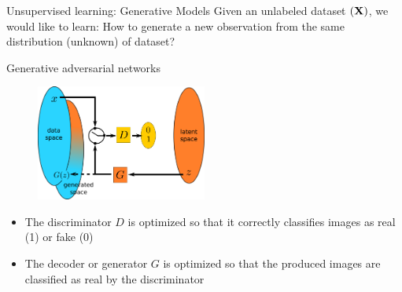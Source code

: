 \documentclass[xcolor=pdftex,dvipsnames,table,mathserif]{beamer}
\begin{document}
\begin{frame}{Unsupervised learning: Generative Models}
  Given an unlabeled dataset $(\mathbf{X})$, we would like to learn:
\alert{How to generate a new observation from the same distribution (unknown) of dataset?}
\begin{figure}
\centering
{}
\end{figure}
\end{frame}



\begin{frame}{Generative adversarial networks \cite{goodfellow_generative_2014}}

  \begin{figure}[ht]
    \centering
    \includegraphics[width=0.5\textwidth]{gan2}
  \end{figure}

  \begin{itemize}
  \item The \alert{discriminator} $D$ is optimized so that it correctly classifies images as real (1) or fake (0)
  \item The decoder or \alert{generator} $G$ is optimized so that the produced images are classified as real by the discriminator
  \end{itemize}

\end{frame}
\end{document}
